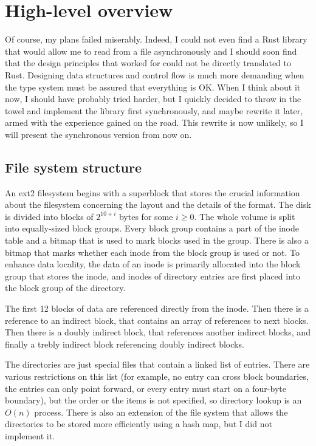 \chapter{High-level overview}

Of course, my plans failed miserably. Indeed, I could not even find a Rust
library that would allow me to read from a file asynchronously and I should soon
find that the design principles that worked for \Cplusplus{} could not be
directly translated to Rust.  Designing data structures and control flow is much
more demanding when the type system must be assured that everything is OK. When
I think about it now, I should have probably tried harder, but I quickly decided
to throw in the towel and implement the library first synchronously, and maybe
rewrite it later, armed with the experience gained on the road. This rewrite is
now unlikely, so I will present the synchronous version from now on.

\section{File system structure}

An ext2 filesystem \cite{ext2-layout} begins with a superblock that stores the
crucial information about the filesystem concerning the layout and the details
of the format. The disk is divided into blocks of $2^{10+i}$ bytes for some $i
\geq 0$. The whole volume is split into equally-sized block groups. Every block
group contains a part of the inode table and a bitmap that is used to mark
blocks used in the group. There is also a bitmap that marks whether each inode
from the block group is used or not. To enhance data locality, the data of an
inode is primarily allocated into the block group that stores the inode, and
inodes of directory entries are first placed into the block group of the
directory.

The first 12 blocks of data are referenced directly from the inode. Then there
is a reference to an indirect block, that contains an array of references to
next blocks. Then there is a doubly indirect block, that references another
indirect blocks, and finally a trebly indirect block referencing doubly indirect
blocks.

The directories are just special files that contain a linked list of entries.
There are various restrictions on this list (for example, no entry can cross
block boundaries, the entries can only point forward, or every entry must start
on a four-byte boundary), but the order or the items is not specified, so
directory lookup is an $O(n)$ process. There is also an extension of the
file system that allows the directories to be stored more efficiently using a
hash map, but I did not implement it.

